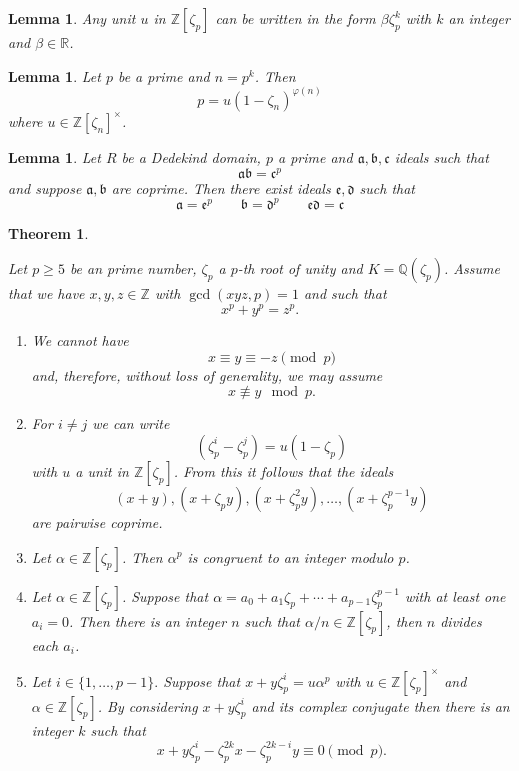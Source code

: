 \documentclass[11pt,a4paper]{amsart}
\theoremstyle{plain}
\newtheorem{thm}[subsection]{Theorem}
\newtheorem{lem}[subsection]{Lemma}
\theoremstyle{definition}
\theoremstyle{definition}
\newcommand{\ZZ}{\mathbb{Z}}
\newcommand{\RR}{\mathbb{R}}
\def\QQ{\mathbb{Q}}
\def\gothb{\mathfrak{b}}
\def\gothc{\mathfrak{c}}
\def \a{\alpha}
\def\gotha{\mathfrak{a}}
\begin{document}
	
	\begin{lem}\label{lem: unit lem}
		Any unit $u$ in $\ZZ[\zeta_p]$ can be written in the form $\beta \zeta_p^k  $ with $k$ an integer and $\beta \in \RR$.
	\end{lem}	
	
	\begin{lem}\label{lem: fac of p in p_th root}
		Let $p$ be a prime and $n=p^k$. Then \[p=u(1-\zeta_n)^{\varphi(n)}\] where $u \in \ZZ[\zeta_n]^{\times}$.
	\end{lem}
	
	\begin{lem}\label{lem: ideals mult to power}
		Let $R$ be a Dedekind domain, $p$ a prime and $\gotha,\gothb,\gothc$ ideals such that \[\gotha\gothb=\gothc^p\] and suppose $\gotha,\gothb$ are coprime. Then there exist ideals $\mathfrak{e},\mathfrak{d}$ such that \[\gotha=\mathfrak{e}^p \qquad \gothb=\mathfrak{d}^p \qquad \mathfrak{e}\mathfrak{d}=\gothc\] 
	\end{lem}
	
	
	\begin{thm}\label{thm:FLT facts}
		
		Let $p \geq 5$ be an prime number, $\zeta_p$ a $p$-th root of unity and $K=\QQ(\zeta_p)$.  Assume that we have $x,y,z \in \ZZ$ with $\gcd(xyz,p)=1$ and such that \[x^p+y^p=z^p.\] 
		
		\begin{enumerate}
			\item We cannot have  \[x \equiv y \equiv -z \pmod p\] and, therefore, without loss of generality, we may assume \[x \not \equiv y \mod p.\]
			
			\item For $i \neq j$ we can write \[(\zeta_p^i-\zeta_p^j)=u(1-\zeta_p)\] with $u$ a unit in $\ZZ[\zeta_p]$. From this it follows that the ideals \[(x+y),(x+\zeta_py),(x+\zeta_p^2y),\dots,(x+\zeta_p^{p-1}y)\] are pairwise coprime. 
			
			\item Let $\a \in \ZZ[\zeta_p]$. Then $\a^p$ is congruent to an integer modulo $p$.
			
			\item Let $\a \in \ZZ[\zeta_p]$.   Suppose that $\a=a_0+a_1\zeta_p+\cdots+a_{p-1}\zeta_p^{p-1}$ with at least one $a_i=0$. Then there is an integer $n$ such that $\a/n \in \ZZ[\zeta_p]$, then $n$ divides each $a_i$. 
			
			
			\item   Let $i \in \{1,\dots,p-1\}.$ Suppose that $x+y\zeta_p^i=u \a^p$ with $u \in \ZZ[\zeta_p]^\times$ and $\a \in \ZZ[\zeta_p]$. By considering $x+y\zeta_p^i$ and its complex conjugate then there is an integer $k$ such that \[x+y\zeta_p^i-\zeta_p^{2k}x-\zeta_p^{2k-i}y \equiv 0 \pmod p.\]
			
			
		\end{enumerate}
		
	\end{thm}
	
\end{document}
